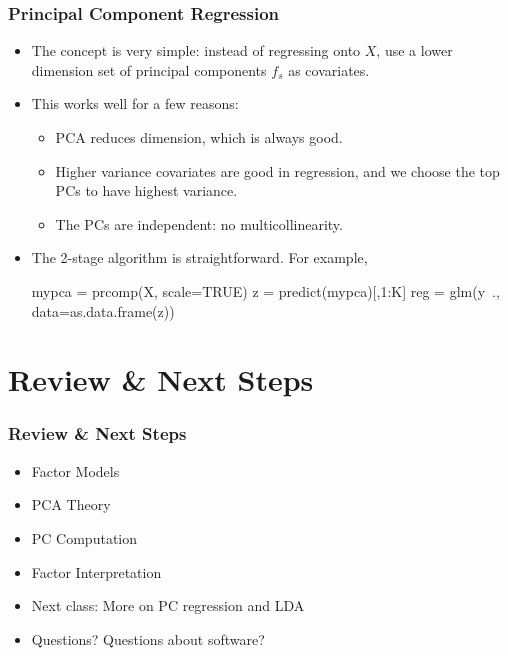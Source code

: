 \documentclass[
  shownotes,
  xcolor={svgnames},
  hyperref={colorlinks,citecolor=DarkBlue,linkcolor=DarkRed,urlcolor=DarkBlue}
  , aspectratio=169]{beamer}
\newcommand{\nv}{\color{Navy}}
\begin{document}
\begin{frame}[fragile]
\frametitle{Principal Component Regression}


\begin{itemize}




\item The concept is very simple: instead of regressing onto $X$, use a lower dimension set of principal components $f_s$ as covariates.

\medskip
\item This works well for a few reasons:
\begin{itemize}
\item PCA reduces dimension, which is always good.
\item Higher variance covariates are good in regression, and we choose
  the top PCs to have highest variance.
\item The PCs are independent: no multicollinearity.
\end{itemize}


\item The 2-stage algorithm is straightforward. For example,

{\nv 
\begin{semiverbatim}\vspace{.25cm}\small
         mypca = prcomp(X, scale=TRUE)
         z = predict(mypca)[,1:K]
         reg = glm(y~., data=as.data.frame(z))
\end{semiverbatim}
}

\end{itemize}


\end{frame}

\section{Review
 \& Next Steps}
\begin{frame}
\frametitle{Review \& Next Steps}
  
\begin{itemize} 
  
  \item Factor Models
  \medskip
  \item PCA Theory
  \medskip
  \item PC Computation 
  \medskip
  \item Factor Interpretation
      \bigskip  
    \item  Next class:  More on PC regression and LDA


  \bigskip  
  \item Questions? Questions about software? 

\end{itemize}
\end{frame}
\end{document}
